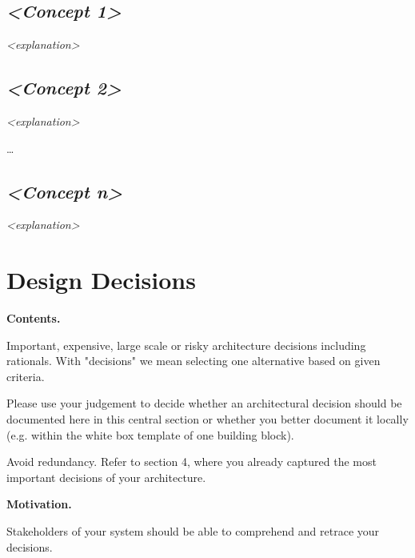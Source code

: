 \documentclass[]{article}
\begin{document}
\hypertarget{__emphasis_concept_1_emphasis}{%
\subsection{\texorpdfstring{\emph{\textless{}Concept
1\textgreater{}}}{\textless{}Concept 1\textgreater{}}}\label{__emphasis_concept_1_emphasis}}

\emph{\textless{}explanation\textgreater{}}

\hypertarget{__emphasis_concept_2_emphasis}{%
\subsection{\texorpdfstring{\emph{\textless{}Concept
2\textgreater{}}}{\textless{}Concept 2\textgreater{}}}\label{__emphasis_concept_2_emphasis}}

\emph{\textless{}explanation\textgreater{}}

\ldots{}

\hypertarget{__emphasis_concept_n_emphasis}{%
\subsection{\texorpdfstring{\emph{\textless{}Concept
n\textgreater{}}}{\textless{}Concept n\textgreater{}}}\label{__emphasis_concept_n_emphasis}}

\emph{\textless{}explanation\textgreater{}}

\hypertarget{section-design-decisions}{%
\section{Design Decisions}\label{section-design-decisions}}

\textbf{Contents.}

Important, expensive, large scale or risky architecture decisions
including rationals. With "decisions" we mean selecting one alternative
based on given criteria.

Please use your judgement to decide whether an architectural decision
should be documented here in this central section or whether you better
document it locally (e.g. within the white box template of one building
block).

Avoid redundancy. Refer to section 4, where you already captured the
most important decisions of your architecture.

\textbf{Motivation.}

Stakeholders of your system should be able to comprehend and retrace
your decisions.
\end{document}
